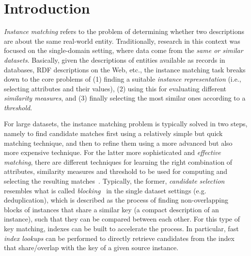 \section{Introduction} 

\emph{Instance matching} \cite{DBLP:journals/ijswis/FerraraNS11} refers to the problem of determining whether two descriptions are about the same real-world entity. Traditionally, research in this context was focused on the single-domain setting, where data come from the \emph{same or similar datasets}. Basically, given the descriptions of entities available as records in databases, RDF descriptions on the Web, etc., the instance matching task breaks down to the core problems of (1) finding a suitable \emph{instance representation} (i.e., selecting attributes and their values), (2) using this for evaluating different \emph{similarity measures}, and (3) finally selecting the most similar ones according to a \emph{threshold}. 

For large datasets, the instance matching problem is typically solved in two steps, namely to find candidate matches first using a relatively simple but quick matching technique, and then to refine them using a more advanced but also more expensive technique. For the latter more sophisticated and \emph{effective matching}, there are different techniques for learning the right combination of attributes, similarity measures and threshold to be used for computing and selecting the resulting matches~\cite{DBLP:conf/cikm/SongH10,MaurouxHJAM09,nikolov08}. Typically, the former, \emph{candidate selection} resembles what is called  \emph{blocking}~\cite{hernandez_merge/purge_1995,MichelsonK06,elmagarmid_duplicate_2007} in the single dataset settings (e.g. deduplication), which is described as the process of finding non-overlapping blocks of instances that share a similar key (a compact description of an instance), such that they can be compared between each other. For this type of key matching, indexes can be built to accelerate the process. In particular, fast \emph{index lookups} can be performed to directly retrieve candidates from the index that share/overlap with the key of a given source instance. 


